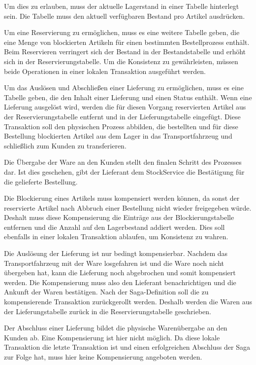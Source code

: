 Um dies zu erlauben, muss der aktuelle Lagerstand in einer Tabelle hinterlegt sein. Die Tabelle muss den aktuell verfügbaren Bestand pro Artikel ausdrücken. 

Um eine Reservierung zu ermöglichen, muss es eine weitere Tabelle geben, die eine Menge von blockierten Artikeln für einen bestimmten Bestellprozess enthält. Beim Reservieren verringert sich der Bestand in der Bestandstabelle und erhöht sich in der Reservierungstabelle. Um die Konsistenz zu gewährleisten, müssen beide Operationen in einer lokalen Transaktion ausgeführt werden. 

Um das Auslösen und Abschließen einer Lieferung zu ermöglichen, muss es eine Tabelle geben, die den Inhalt einer Lieferung und einen Status enthält.
Wenn eine Lieferung ausgelöst wird, werden die für diesen Vorgang reservierten Artikel aus der Reservierungstabelle entfernt und in der Lieferungstabelle eingefügt. Diese Transaktion soll den physischen Prozess abbilden, die bestellten und für diese Bestellung blockierten Artikel aus dem Lager in das Transportfahrzeug und schließlich zum Kunden zu transferieren.

Die Übergabe der Ware an den Kunden stellt den finalen Schritt des Prozesses dar. Ist dies geschehen, gibt der Lieferant dem StockService die Bestätigung für die gelieferte Bestellung.

Die Blockierung eines Artikels muss kompensiert werden können, da sonst der reservierte Artikel nach Abbruch einer Bestellung nicht wieder freigegeben würde. Deshalt muss diese Kompensierung die Einträge aus der Blockierungstabelle entfernen und die Anzahl auf den Lagerbestand addiert werden. Dies soll ebenfalls in einer lokalen Transaktion ablaufen, um Konsistenz zu wahren.

Die Auslösung der Lieferung ist nur bedingt kompensierbar. Nachdem das Transportfahrzeug mit der Ware losgefahren ist und die Ware noch nicht übergeben hat, kann die Lieferung noch abgebrochen und somit kompensiert werden. Die Kompensierung muss also den Lieferant benachrichtigen und die Ankunft der Waren bestätigen. Nach der Saga-Definition soll die zu kompensierende Transaktion zurückgerollt werden. Deshalb werden die Waren aus der Lieferungstabelle zurück in die Reservierungstabelle geschrieben. 

Der Abschluss einer Lieferung bildet die physische Warenübergabe an den Kunden ab. Eine Kompensierung ist hier nicht möglich. Da diese lokale Transaktion die letzte Transaktion ist und einen erfolgreichen Abschluss der Saga zur Folge hat, muss hier keine Kompensierung angeboten werden.

